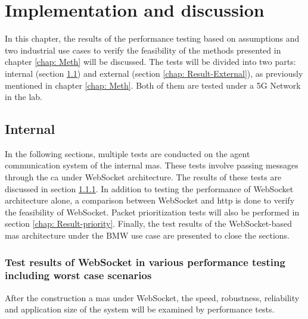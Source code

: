 \chapter{Implementation and discussion} \label{chap: Result}

In this chapter, the results of the performance testing based on assumptions 
and two industrial use cases to verify the feasibility of the methods presented 
in chapter \ref{chap: Meth} will be discussed. The tests will be divided into 
two parts: internal (section \ref{chap: Result-Internal}) and 
external (section \ref{chap: Result-External}), as previously mentioned in 
chapter \ref{chap: Meth}. Both of them are tested under a 5G Network in the lab.



\section{Internal}\label{chap: Result-Internal}
In the following sections, multiple tests are conducted on the agent communication system 
of the internal \gls{mas}. These tests involve passing messages through the \gls{ca} under 
WebSocket architecture. The results of these tests are discussed in 
section \ref{chap: Result-WS}. In addition to testing the performance of WebSocket 
architecture alone, a comparison between WebSocket and \gls{http} is done to verify 
the feasibility of WebSocket. Packet prioritization tests will also be performed in 
section \ref{chap: Result-priority}. Finally, the test results of the 
WebSocket-based \gls{mas} architecture under the BMW use case are presented to 
close the sections.


\subsection{Test results of WebSocket in various performance testing including worst case scenarios} \label{chap: Result-WS}

After the construction a \gls{mas} under WebSocket, the speed, robustness, 
reliability and application size of the system will be examined by 
performance tests. 

